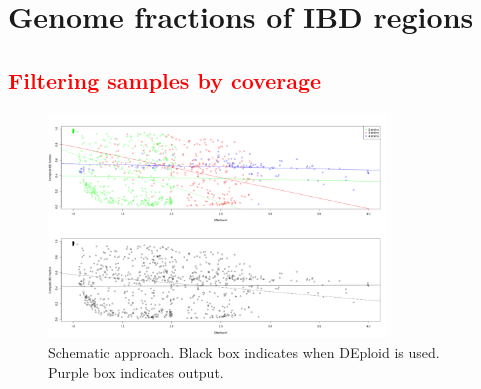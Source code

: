 \documentclass{article}
\begin{document}
\newpage


\section{Genome fractions of IBD regions}

\subsection{\textcolor{red}{Filtering samples by coverage}}

\begin{figure}[h]
\centering
{}
\caption{}
\end{figure}



\begin{figure}[htp]
  \centering{}
  \includegraphics[width=0.8\textwidth]{effectiveK_IBD.png}
  \caption{Schematic approach. Black box indicates when DEploid is used. Purple box indicates output.}\label{fig:IBD_frac_hist}
\end{figure}
\end{document}
